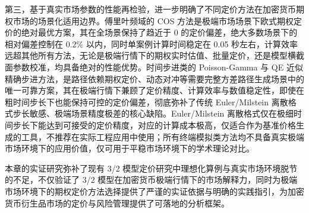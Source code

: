 第三，基于真实市场参数的性能再检验，进一步明确了不同定价方法在加密货币期权市场的场景化适用边界。傅里叶频域的 COS 方法是极端市场场景下欧式期权定价的绝对最优方案，其在全场景保持了趋近于 0 的定价偏差，绝大多数场景下的相对偏差控制在 0.2\% 以内，同时单案例计算时间稳定在 0.05 秒左右，计算效率远超其他所有方法，无论是极端行情下的期权实时估值、批量定价，还是模型横截面参数校准，均具备绝对的性能优势。时间步进类的 Poisson-Gamma 与 QE 近似精确步进方法，是路径依赖期权定价、动态对冲等需要完整方差路径生成场景中的唯一可靠方案，其在极端行情下兼顾了定价精度、计算效率与数值稳定性，即使在粗时间步长下也能保持可控的定价偏差，彻底弥补了传统 Euler/Milstein 离散格式步长敏感、极端场景精度极差的核心缺陷。Euler/Milstein 离散格式仅在极细时间步长下能达到可接受的定价精度，对应的计算成本极高，仅适合作为基准价格生成的工具，不推荐在实际工程应用中使用；所有终端模拟类方法均不具备真实极端市场环境下的应用价值，仅可用于平稳市场环境下的学术理论对比。

本章的实证研究弥补了现有 3/2 模型定价研究中理想化算例与真实市场环境脱节的不足，不仅验证了 3/2 模型在加密货币极端行情下的市场解释力，同时为极端市场环境下的期权定价方法选择提供了严谨的实证依据与明确的实践指引，为加密货币衍生品市场的定价与风险管理提供了可落地的分析框架。